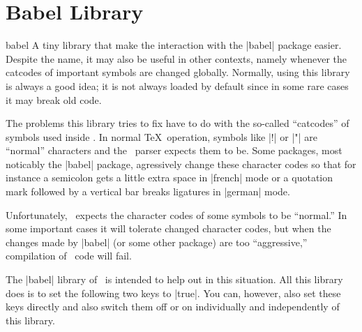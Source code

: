 %
%
%

\section{Babel Library}
\label{section-library-babel}


\begin{pgflibrary}{babel}
  A tiny library that make the interaction with the |babel| package
  easier. Despite the name, it may also be useful in other contexts,
  namely whenever the catcodes of important symbols are changed
  globally. Normally, using this library is always a good idea; it is not
  always loaded by default since in some rare cases it may break old
  code. 
\end{pgflibrary}

The problems this library tries to fix have to do with the so-called
``catcodes'' of symbols used inside \tikzname. In normal \TeX\
operation, symbols like |!| or |"| are ``normal'' characters and the
\tikzname\ parser expects them to be. Some packages, most noticably
the |babel| package, agressively change these character codes so that
for instance a semicolon gets a little extra space in |french| mode or
a quotation mark followed by a vertical bar breaks ligatures in
|german| mode.

Unfortunately, \tikzname\ expects the character codes of some symbols
to be ``normal.'' In some important cases it will tolerate changed
character codes, but when the changes made by |babel| (or some other
package) are too ``aggressive,'' compilation of \tikzname\ code will
fail.

The |babel| library of \tikzname\ is intended to help out in this
situation. All this library does is to set the following two keys to
|true|. You can, however, also set these keys directly and also switch
them off or on individually and independently of this library. 


